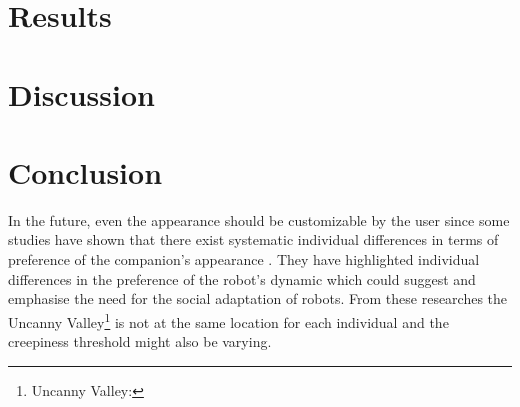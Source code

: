 \documentclass[smallextended]{svjour3}
\begin{document}
\section{Results}
%



\section{Discussion}
\section{Conclusion}



In the future, even the appearance should be customizable by the user since some studies have shown that there exist systematic individual differences in terms of preference of the companion's appearance \cite{Walters2008}. 
They have highlighted individual differences in the preference of the robot's dynamic which could suggest and emphasise the need for the social adaptation of robots. 
From these researches the Uncanny Valley\footnote{Uncanny Valley:} is not at the same location for each individual and the creepiness threshold might also be varying. 
\end{document}
